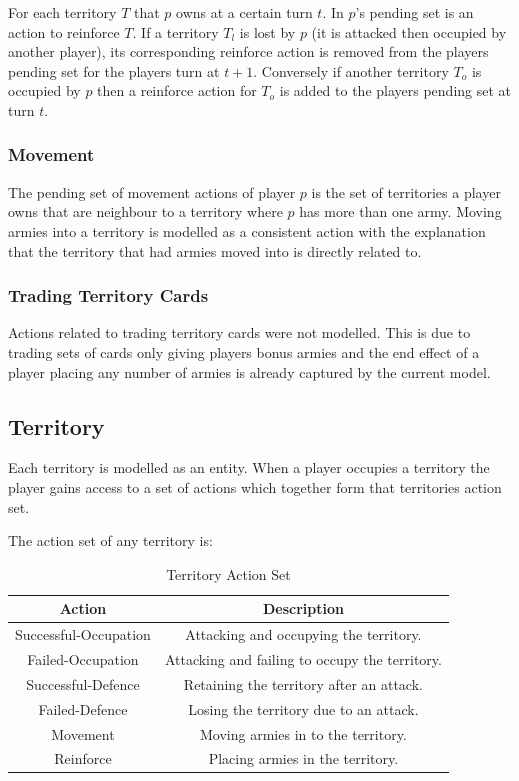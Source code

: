 \documentclass[parskip]{cs4rep}
\begin{document}
For each territory $T$ that $p$ owns at a certain turn $t$. In $p$'s pending set is an action to reinforce $T$. If a territory $T_{l}$ is lost by $p$ (it is attacked then occupied by another player), its corresponding reinforce action is removed from the players pending set for the players turn at $t+1$. Conversely if another territory $T_{o}$ is occupied by $p$ then a reinforce action for $T_{o}$ is added to the players pending set at turn $t$.

\subsubsection{Movement}

The pending set of movement actions of player $p$ is the set of territories a player owns that are neighbour to a territory where $p$ has more than one army. Moving armies into a territory is modelled as a consistent action with the explanation that the territory that had armies moved into is directly related to.

\subsubsection{Trading Territory Cards}

Actions related to trading territory cards were not modelled. This is due to trading sets of cards only giving players bonus armies and the end effect of a player placing any number of armies is already captured by the current model.

\subsection{Territory}

Each territory is modelled as an entity. When a player occupies a territory the player gains access to a set of actions which together form that territories action set.

The action set of any territory is:

\begin{table}[ht]
\centering
\begin{tabular}{|c|c|}
\hline 
\textbf{Action} & \textbf{Description} \\ 
\hline 
Successful-Occupation & Attacking and occupying the territory.\\ 
\hline 
Failed-Occupation & Attacking and failing to occupy the territory.\\ 
\hline 
Successful-Defence & Retaining the territory after an attack.\\ 
\hline 
Failed-Defence & Losing the territory due to an attack.\\
\hline
Movement & Moving armies in to the territory.\\
\hline  
Reinforce & Placing armies in the territory.\\
\hline 
\end{tabular}
\caption{Territory Action Set}
\label{table:territory-actions-bonus}
\end{table}
\end{document}
